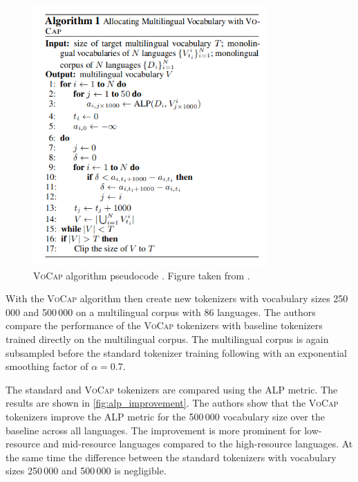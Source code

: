 \begin{figure}[ht]
    \centering
    \includegraphics[width=0.8\textwidth]{img/temp/vocap_algo.png}
    \caption{\textsc{VoCap} algorithm pseudocode \cite{zheng_allocating_2021}. Figure taken from \cite{zheng_allocating_2021}.}
    \label{alg:vocab_allocation}
\end{figure}

With the \textsc{VoCap} algorithm  then create new tokenizers with vocabulary sizes 250\,000 and 500\,000 on a multilingual corpus with 86 languages. The authors compare the performance of the \textsc{VoCap} tokenizers with baseline tokenizers trained directly on the multilingual corpus. The multilingual corpus is again subsampled before the standard tokenizer training following \citet{devlin_bert_2019,lample_cross-lingual_2019} with an exponential smoothing factor of $\alpha=0.7$.

The standard and \textsc{VoCap} tokenizers are compared using the ALP metric. The results are shown in \autoref{fig:alp_improvement}. The authors show that the \textsc{VoCap} tokenizers improve the ALP metric for the 500\,000 vocabulary size over the baseline across all languages. The improvement is more prominent for low-resource and mid-resource languages compared to the high-resource languages. At the same time the difference between the standard tokenizers with vocabulary sizes 250\,000 and 500\,000 is negligible.

